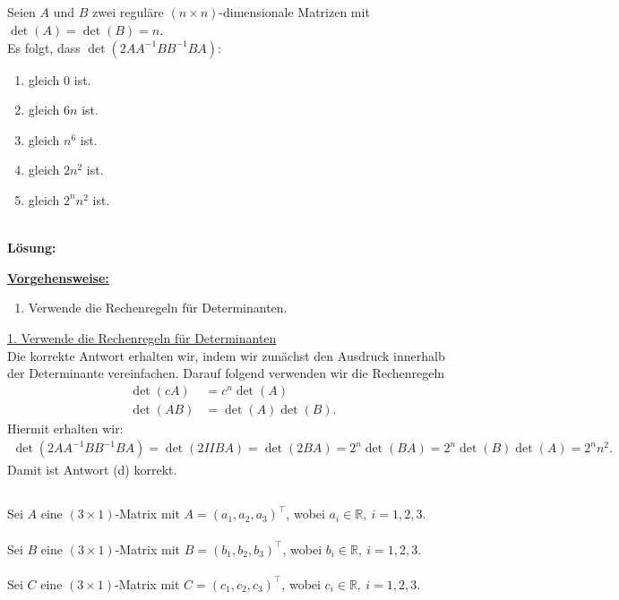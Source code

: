 \subsection*{}
Seien $A$ und $B$ zwei reguläre $(n \times n)$-dimensionale Matrizen mit $\det(A) = \det(B) = n$.\\
Es folgt, dass $\det(2AA^{-1} B B^{-1} B A)$:
\renewcommand{\labelenumi}{(\alph{enumi})}
\begin{enumerate}
	\item 
	gleich $0$ ist.
	\item
	gleich $6n$ ist.
	\item
	gleich $n^6$ ist.
	\item
	gleich $2 n^2$ ist.
	\item
	gleich $2^n n^2$ ist.
\end{enumerate}
\ \\
\textbf{Lösung:}
\begin{mdframed}
\underline{\textbf{Vorgehensweise:}}
\renewcommand{\labelenumi}{\theenumi.}
\begin{enumerate}
\item Verwende die Rechenregeln für Determinanten.
\end{enumerate}
\end{mdframed}

\underline{1. Verwende die Rechenregeln für Determinanten}\\
Die korrekte Antwort erhalten wir, indem wir zunächst den Ausdruck innerhalb der Determinante vereinfachen. 
Darauf folgend verwenden wir die Rechenregeln
\begin{align*}
	\det(c A)&= c^n \det(A)\\
	\det(AB) &= \det(A) \det(B).
\end{align*}
Hiermit erhalten wir:
\begin{align*}
	\det(2AA^{-1} B B^{-1} B A)
	=
	\det(2I I B A)
	=
	\det(2B A)
	=
	2^n \det(BA) 
	=
	2^n \det(B) \det(A)
	=
	2^n n^2.
\end{align*}
Damit ist Antwort (d) korrekt.

\newpage

\subsection*{}
Sei $ A $ eine $ (3 \times 1) $-Matrix mit $A = (a_1, a_2, a_3)^\top$, wobei $ a_i \in \mathbb{R}, \ i = 1,2,3$.\\
\\
Sei $ B $ eine $ (3 \times 1) $-Matrix mit $B = (b_1, b_2, b_3)^\top$, wobei $ b_i \in \mathbb{R}, \ i = 1,2,3$.\\
\\
Sei $ C $ eine $ (3 \times 1) $-Matrix mit $C = (c_1, c_2, c_3)^\top$, wobei $ c_i \in \mathbb{R}, \ i = 1,2,3$.\\

